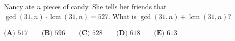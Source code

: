 Nancy ate $n$ pieces of candy. She tells her friends that $\gcd(31,n)\cdot\operatorname{lcm}(31,n)=527$. What is $\gcd(31,n)+\operatorname{lcm}(31,n)$?

$\textbf{(A) }517\qquad\textbf{(B) }596\qquad\textbf{(C) }528\qquad\textbf{(D) }618\qquad\textbf{(E) }613$
